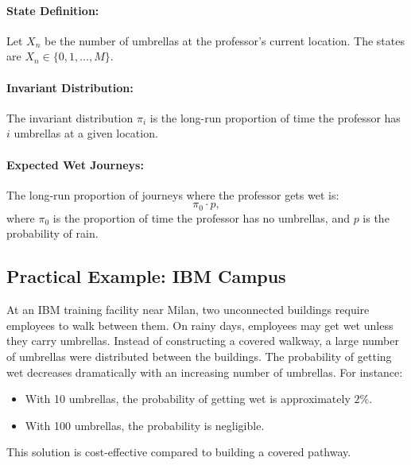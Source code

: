 \paragraph{State Definition:}
Let \(X_n\) be the number of umbrellas at the professor's current location. The states are \(X_n \in \{0, 1, \dots, M\}\).

\paragraph{Invariant Distribution:}
The invariant distribution \(\pi_i\) is the long-run proportion of time the professor has \(i\) umbrellas at a given location.

\paragraph{Expected Wet Journeys:}
The long-run proportion of journeys where the professor gets wet is:
\[
\pi_0 \cdot p,
\]
where \(\pi_0\) is the proportion of time the professor has no umbrellas, and \(p\) is the probability of rain.

\subsection{Practical Example: IBM Campus}
At an IBM training facility near Milan, two unconnected buildings require employees to walk between them. On rainy days, employees may get wet unless they carry umbrellas. Instead of constructing a covered walkway, a large number of umbrellas were distributed between the buildings. The probability of getting wet decreases dramatically with an increasing number of umbrellas. For instance:
\begin{itemize}
    \item With 10 umbrellas, the probability of getting wet is approximately \(2\%\).
    \item With 100 umbrellas, the probability is negligible.
\end{itemize}
This solution is cost-effective compared to building a covered pathway.


